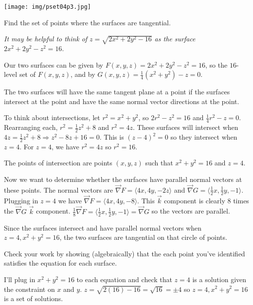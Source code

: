 \documentclass[12pt,letterpaper,noanswers]{exam}
\begin{document}
\begin{questions}
\begin{parts}
\begin{solution}
\texttt{[image: img/pset04p3.jpg]}
\end{solution}
\item Find the set of points where the surfaces are tangential.

\emph{It may be helpful to think of $z = \sqrt{2x^2+2y^2-16}$ as the surface $2x^2 + 2y^2 - z^2 = 16.$}
\begin{solution}
Our two surfaces can be given by $F(x,y,z) = 2x^2+2y^2 - z^2 = 16$, so the $16$-level set of $F(x,y,z)$, and by $G(x,y,z)=\frac{1}{4}(x^2+y^2)-z = 0$.

The two surfaces will have the same tangent plane at a point if the surfaces intersect at the point and have the same normal vector directions at the point.

To think about intersections, let $r^2 = x^2+y^2$, so $2r^2 - z^2 = 16$ and $\frac{1}{4}r^2 - z = 0$.  Rearranging each, $r^2 = \frac{1}{2}z^2 + 8$ and $r^2 = 4z$.  These surfaces will intersect when $4z = \frac{1}{2}z^2 + 8 \Rightarrow z^2 - 8z + 16 = 0$.  This is $(z-4)^2 = 0$ so they intersect when $z = 4$.  For $z = 4$, we have $r^2 = 4z$ so $r^2 = 16$.

The points of intersection are points $(x,y,z)$ such that $x^2+y^2 = 16$ and $z = 4$.

Now we want to determine whether the surfaces have parallel normal vectors at these points.  The normal vectors are $\vec \nabla F = \langle 4x, 4y, -2z\rangle$ and $\vec\nabla G = \langle \frac{1}{2}x, \frac{1}{2}y, -1\rangle.$  Plugging in $z = 4$ we have $\vec\nabla F = \langle 4x, 4y, -8\rangle$.  This $\vec k$ component is clearly $8$ times the $\vec\nabla G$ $\vec k$ component.  $\frac{1}{8}\vec\nabla F = \langle \frac{1}{2}x , \frac{1}{2}y , -1\rangle = \vec\nabla G$ so the vectors are parallel.

Since the surfaces intersect and have parallel normal vectors when $z =4, x^2+y^2 = 16$, the two surfaces are tangential on that circle of points.
\end{solution}
\item Check your work by showing (algebraically) that the each point you've identified satisfies the equation for each surface.

\begin{solution}
I'll plug in $x^2+y^2 = 16$ to each equation and check that $z = 4$ is a solution given the constraint on $x$ and $y$.  $z = \sqrt{2(16)-16} = \sqrt{16} = \pm 4$ so $z = 4, x^2+y^2 = 16$ is a set of solutions.


\end{solution}
\end{parts}
\end{questions}
\end{document}
